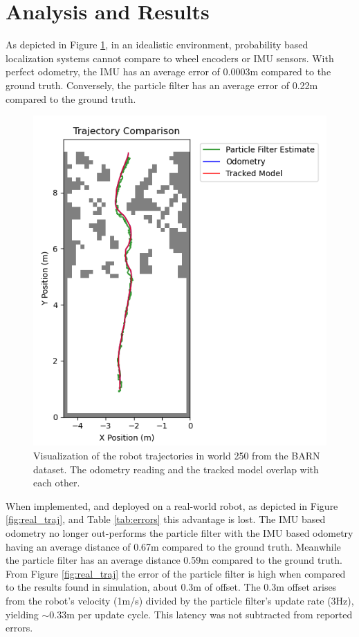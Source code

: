 \documentclass[10.5pt]{article}
\begin{document}
\section{Analysis and Results}
As depicted in Figure \ref{fig:sim_traj}, in an idealistic environment, probability based localization systems cannot compare to wheel encoders or IMU sensors. With perfect odometry, the IMU has an average error of 0.0003m compared to the ground truth. Conversely, the particle filter has an average error of 0.22m compared to the ground truth.
\begin{figure}[H]
    \centering
    \includegraphics[width=1\linewidth]{combined_traj_sim.png}
    \caption{Visualization of the robot trajectories in world 250 from the BARN dataset. The odometry reading and the tracked model overlap with each other.}
    \label{fig:sim_traj}
\end{figure}
When implemented, and deployed on a real-world robot, as depicted in Figure \ref{fig:real_traj}, and Table \ref{tab:errors} this advantage is lost. The IMU based odometry no longer out-performs the particle filter with the IMU based odometry having an average distance of 0.67m compared to the ground truth. Meanwhile the particle filter has an average distance 0.59m compared to the ground truth. From Figure \ref{fig:real_traj} the error of the particle filter is high when compared to the results found in simulation, about 0.3m of offset. The 0.3m offset arises from the robot’s velocity (1m/s) divided by the particle filter’s update rate (3Hz), yielding \(\sim\)0.33m per update cycle. This latency was not subtracted from reported errors.
\end{document}
